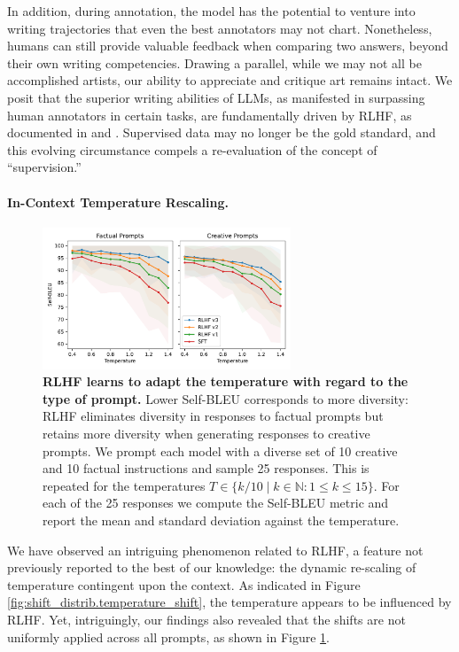\documentclass{article}
\begin{document}
In addition, during annotation, the model has the potential to venture into writing trajectories that even the best annotators may not chart. Nonetheless, humans can still provide valuable feedback when comparing two answers, beyond their own writing competencies. Drawing a parallel, while we may not all be accomplished artists, our ability to appreciate and critique art remains intact. We posit that the superior writing abilities of LLMs, as manifested in surpassing human annotators in certain tasks, are fundamentally driven by RLHF, as documented in \cite{gilardi2023chatgpt} and \cite{huang2023chatgpt}. Supervised data may no longer be the gold standard, and this evolving circumstance compels a re-evaluation of the concept of ``supervision.''


\paragraph{In-Context Temperature Rescaling.} 

\begin{figure}[h]
\centering
\includegraphics[width=0.66\textwidth]{img/creative_factual_temp_scaling.pdf}
\caption{\textbf{RLHF learns to adapt the temperature with regard to the type of prompt.} Lower Self-BLEU corresponds to more diversity: RLHF eliminates diversity in responses to factual prompts but retains more diversity when generating responses to creative prompts. 
We prompt each model with a diverse set of 10 creative and 10 factual instructions and sample 25 responses. This is repeated for the temperatures $T\in\{k/10 \mid k\in\mathbb N:1\le k\le 15\}$. For each of the 25 responses we compute the Self-BLEU metric and report the mean and standard deviation against the temperature. }
\label{fig:creative_factual_temp_scaling}
\end{figure}

We have observed an intriguing phenomenon related to RLHF, a feature not previously reported to the best of our knowledge: the dynamic re-scaling of temperature contingent upon the context. As indicated in Figure \ref{fig:shift_distrib.temperature_shift}, the temperature appears to be influenced by RLHF. Yet, intriguingly, our findings also revealed that the shifts are not uniformly applied across all prompts, as shown in Figure \ref{fig:creative_factual_temp_scaling}.
\end{document}

